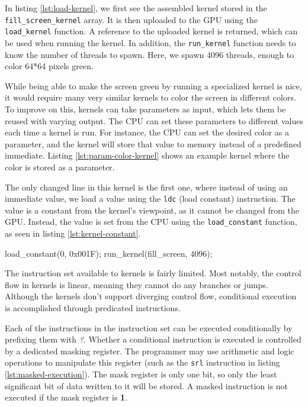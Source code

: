 \documentclass[../main/report.tex]{subfiles}
\begin{document}
In listing \ref{lst:load-kernel}, we first see the assembled kernel stored in the
\verb/fill_screen_kernel/ array.
It is then uploaded to the GPU using the \verb/load_kernel/ function.
A reference to the uploaded kernel is returned, which can be used when running the kernel.
In addition, the \verb/run_kernel/ function needs to know the number of threads to spawn.
Here, we spawn 4096 threads, enough to color 64*64 pixels green.

While being able to make the screen green by running a specialized kernel is nice,
it would require many very similar kernels to color the screen in different colors.
To improve on this, kernels can take parameters as input,
which lets them be reused with varying output.
The CPU can set these parameters to different values each time a kernel is run.
For instance, the CPU can set the desired color as a parameter,
and the kernel will store that value to memory instead of a predefined immediate.
Listing \ref{lst:param-color-kernel} shows an example kernel where the color is stored as a parameter.


The only changed line in this kernel is the first one,
where instead of using an immediate value, we load a value using the \verb/ldc/ (load constant) instruction.
The value is a constant from the kernel's viewpoint, as it cannot be changed from the GPU.
Instead, the value is set from the CPU using the \verb/load_constant/ function,
as seen in listing \ref{lst:kernel-constant}.

\begin{c-code}[caption=Now drawing a blue screen using parameters, label=lst:kernel-constant]
load_constant(0, 0x001F);
run_kernel(fill_screen, 4096);
\end{c-code}

The instruction set available to kernels is fairly limited.
Most notably, the control flow in kernels is linear, meaning they cannot do any branches or jumps.
Although the kernels don't support diverging control flow,
conditional execution is accomplished through predicated instructions.

Each of the instructions in the instruction set can be executed conditionally by prefixing them with \emph{?}.
Whether a conditional instruction is executed is controlled by a dedicated masking register.
The programmer may use arithmetic and logic operations to manipulate this register (such as the \verb/srl/ instruction in listing \ref{lst:masked-execution}).
The mask register is only one bit, so only the least significant bit of data written to it will be stored.
A masked instruction is not executed if the mask register is \textbf{1}.
\end{document}
